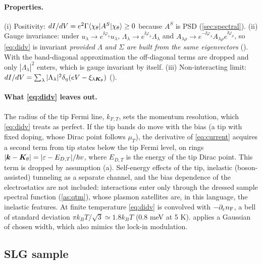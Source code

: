 \paragraph{Properties.} (i) Positivity: $dI/dV=e^2\Gamma\langle \chi_\theta|A^S|\chi_\theta\rangle\ge0$ because $A^S$ is PSD
(\cref{sec:spectral}). (ii) Gauge invariance: under $u_\lambda\to e^{\ii\varphi_\lambda}u_\lambda$,
$\Lambda_\lambda\to e^{\ii\varphi_\lambda}\Lambda_\lambda$ and $A_{\lambda\rho}\to e^{-\ii\varphi_\lambda}A_{\lambda\rho}e^{\ii\varphi_\rho}$,
so \cref{eq:didv} is invariant \emph{provided $\Lambda$ and $\Sigma$ are built from the same eigenvectors}
(). With the band-diagonal approximation the off-diagonal terms are dropped and
only $|\Lambda_\lambda|^2$ enters, which is gauge invariant by itself. (iii) Non-interacting limit:
$dI/dV=\sum_\lambda|\Lambda_\lambda|^2\delta_{\eta}(eV-\xi_{\lambda\bm K_\theta})$ ().

\paragraph{What \cref{eq:didv} leaves out.} The radius of the tip Fermi line, $k_{F,T}$, sets the momentum
resolution, which \cref{eq:didv} treats as perfect. If the tip bands do move with the bias (a tip with fixed
doping, whose Dirac point follows $\mu_T$), the derivative of \cref{eq:current} acquires a second term from tip
states below the tip Fermi level, on rings $|\bm k-\bm K_\theta|=|\varepsilon-E_{D,T}|/\hbar v$, where $E_{D,T}$ is the energy of the tip Dirac point. This term is dropped by
assumption (a). Self-energy effects of the tip, inelastic (boson-assisted) tunneling as a separate channel, and the
bias dependence of the electrostatics are not included: interactions enter only through the dressed sample
spectral function (\cref{as:qtm}), whose plasmon satellites are, in this language, the inelastic features.
At finite temperature \cref{eq:didv} is convolved with $-\partial_\varepsilon n_{\rm F}$, a bell of standard deviation
$\pi k_BT/\sqrt3\simeq1.8k_BT$ (0.8 meV at 5 K).  applies a Gaussian of chosen width,
which also mimics the lock-in modulation.

\subsection{SLG sample}
\label{sec:qtmslg}


